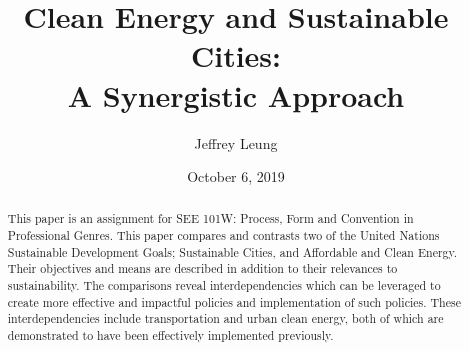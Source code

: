 \documentclass[10pt, oneside, letterpaper]{article}
\title{\textbf{Clean Energy and Sustainable Cities:\\A Synergistic Approach}}
\author{Jeffrey Leung}
\affil{Simon Fraser University}
\date{October 6, 2019}
\begin{document}
	\maketitle

	\begin{abstract}
		This paper is an assignment for SEE 101W: Process, Form and Convention in Professional Genres. This paper compares and contrasts two of the United Nations Sustainable Development Goals; Sustainable Cities, and Affordable and Clean Energy. Their objectives and means are described in addition to their relevances to sustainability. The comparisons reveal interdependencies which can be leveraged to create more effective and impactful policies and implementation of such policies. These interdependencies include transportation and urban clean energy, both of which are demonstrated to have been effectively implemented previously.
	\end{abstract}
\end{document}
